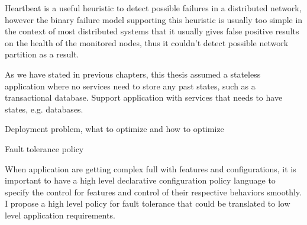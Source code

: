 Heartbeat is a useful heuristic to detect possible failures in a distributed network, however the binary failure model supporting this heuristic is usually too simple in the context of most distributed systems that it usually gives false positive results on the health of the monitored nodes, thus it couldn't detect possible network partition as a result.

As we have stated in previous chapters, this thesis assumed a stateless application where no services need to store any past states, such as a transactional database. 
Support application with services that needs to have states, e.g. databases.



Deployment problem, what to optimize and how to optimize




Fault tolerance policy

When application are getting complex full with features and configurations, 
it is important to have a high level declarative configuration policy language 
to specify the control for features and control of their respective behaviors 
smoothly. I propose a high level policy for fault tolerance that could be
translated to low level application requirements.

